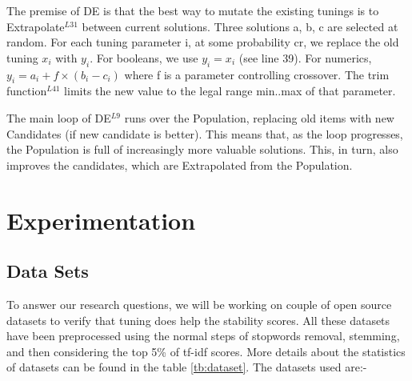 \documentclass[10pt,conference]{IEEEtran}
\theoremstyle{break}
\begin{document}
The premise of DE is that the best way to mutate the existing tunings is to Extrapolate$^{L31}$ between current solutions. Three solutions a, b, c are selected at random. For each tuning parameter i, at some probability cr, we replace the old tuning $x_i$ with $y_i$. For booleans, we use $y_i = x_i$ (see line 39). For numerics, $y_i = a_i + f \times (b_i - c_i)$ where f is a parameter controlling crossover. The trim function$^{L41}$ limits the new value to the legal range min..max of that parameter.

The main loop of DE$^{L9}$ runs over the Population, replacing old items with new Candidates (if new candidate is better). This means that, as the loop progresses, the Population is full of increasingly more valuable solutions. This, in turn, also improves the candidates, which are Extrapolated from the Population.

\section{Experimentation}

\subsection{Data Sets}
To answer our research questions, we will be working on couple of open source datasets to verify that tuning does help the stability scores. All these datasets have been preprocessed using the normal steps of stopwords removal, stemming, and then considering the top 5\% of tf-idf scores. More details about the statistics of datasets can be found in the table \ref{tb:dataset}. The datasets used are:-
\end{document}

